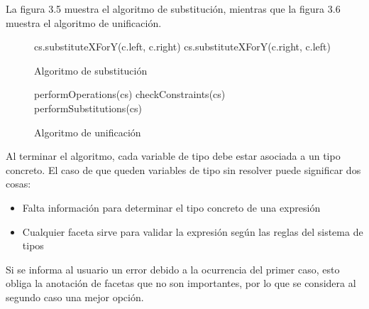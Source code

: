 La figura 3.5 muestra el algoritmo de substitución, mientras que la figura 3.6 muestra el algoritmo de unificación.

\begin{figure}[ht]
  \centering
  \label{pseudosubst}
  \begin{mdframed}
    \begin{algorithmic}
              \State cs.substituteXForY(c.left, c.right)
            \EndIf
              \State cs.substituteXForY(c.right, c.left)
            \EndIf
          \EndFor
      \EndFunction
    \end{algorithmic}
  \end{mdframed}
  \caption{Algoritmo de substitución}
\end{figure}


\begin{figure}[ht]
  \centering
  \label{pseudouni}
  \begin{mdframed}
    \begin{algorithmic}
            \State performOperations(cs)
            \State checkConstraints(cs)
            \State performSubstitutions(cs)
          \EndWhile
      \EndFunction
    \end{algorithmic}
  \end{mdframed}
  \caption{Algoritmo de unificación}
\end{figure}

Al terminar el algoritmo, cada variable de tipo debe estar asociada a un tipo concreto. El caso de que queden variables de tipo sin resolver puede significar dos cosas:

\begin{itemize}
  \item Falta información para determinar el tipo concreto de una expresión
  \item Cualquier faceta sirve para validar la expresión según las reglas del sistema de tipos
\end{itemize}

Si se informa al usuario un error debido a la ocurrencia del primer caso, esto obliga la anotación de facetas que no son importantes, por lo que se considera al segundo caso una mejor opción.
